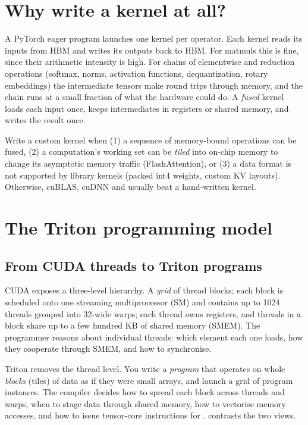 \section{Why write a kernel at all?}
A PyTorch eager program launches one kernel per operator. Each kernel reads its inputs
from HBM and writes its outputs back to HBM. For matmuls this is fine, since their
arithmetic intensity is high. For chains of elementwise and reduction operations
(softmax, norms, activation functions, dequantization, rotary embeddings) the
intermediate tensors make round trips through memory, and the chain runs at a small
fraction of what the hardware could do. A \emph{fused} kernel loads each input once,
keeps intermediates in registers or shared memory, and writes the result once.

\begin{keyidea}
Write a custom kernel when (1) a sequence of memory-bound operations can be fused, (2) a
computation's working set can be \emph{tiled} into on-chip memory to change its
asymptotic memory traffic (FlashAttention), or (3) a data format is not supported by
library kernels (packed int4 weights, custom KV layouts). Otherwise, cuBLAS, cuDNN and
 usually beat a hand-written kernel.
\end{keyidea}

\section{The Triton programming model}

\subsection{From CUDA threads to Triton programs}
CUDA exposes a three-level hierarchy. A \emph{grid} of thread blocks; each block is
scheduled onto one streaming multiprocessor (SM) and contains up to 1024 threads grouped
into 32-wide warps; each thread owns registers, and threads in a block share up to a few
hundred KB of shared memory (SMEM). The programmer reasons about individual threads:
which element each one loads, how they cooperate through SMEM, and how to synchronise.

Triton removes the thread level. You write a \emph{program} that operates on whole
\emph{blocks} (tiles) of data as if they were small arrays, and launch a grid of program
instances. The compiler decides how to spread each block across threads and warps, when
to stage data through shared memory, how to vectorise memory accesses, and how to issue
tensor-core instructions for .  contrasts the
two views.

